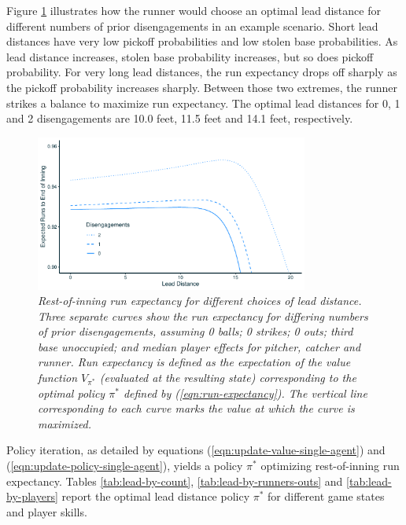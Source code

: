 \documentclass{article}
\begin{document}
      Figure \ref{fig:finding-optimal-lead} illustrates how the runner would choose an optimal lead distance for different numbers of prior disengagements in an example scenario. Short lead distances have very low pickoff probabilities and low stolen base probabilities. As lead distance increases, stolen base probability increases, but so does pickoff probability. For very long lead distances, the run expectancy drops off sharply as the pickoff probability increases sharply. Between those two extremes, the runner strikes a balance to maximize run expectancy. The optimal lead distances for 0, 1 and 2 disengagements are 10.0 feet, 11.5 feet and 14.1 feet, respectively.
      
      \begin{figure}[H]
        \centering
        \includegraphics[width = 0.8\textwidth]{finding_optimal_lead_light.pdf}
        \caption{
          \it Rest-of-inning run expectancy for different choices of lead distance. Three separate curves show the run expectancy for differing numbers of prior disengagements, assuming 0 balls; 0 strikes; 0 outs; third base unoccupied; and median player effects for pitcher, catcher and runner. Run expectancy is defined as the expectation of the value function $V_{\pi^*}$ (evaluated at the resulting state) corresponding to the optimal policy $\pi^*$ defined by (\ref{eqn:run-expectancy}). The vertical line corresponding to each curve marks the value at which the curve is maximized.
        }
        \label{fig:finding-optimal-lead}
      \end{figure}

      Policy iteration, as detailed by equations (\ref{eqn:update-value-single-agent}) and (\ref{eqn:update-policy-single-agent}), yields a policy $\pi^*$ optimizing rest-of-inning run expectancy. Tables \ref{tab:lead-by-count}, \ref{tab:lead-by-runners-outs} and \ref{tab:lead-by-players} report the optimal lead distance policy $\pi^*$ for different game states and player skills.
    
\end{document}
